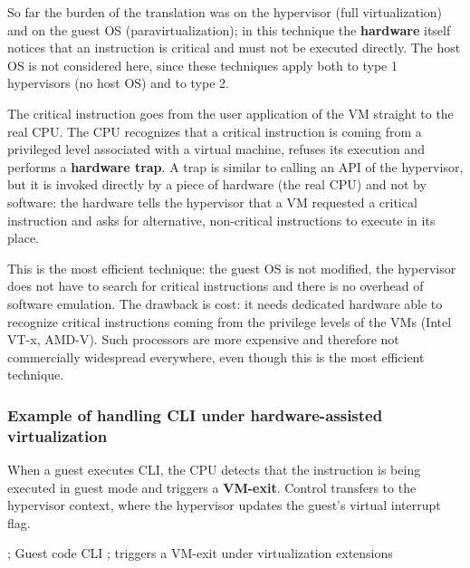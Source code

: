 So far the burden of the translation was on the hypervisor (full virtualization) and on the guest OS (paravirtualization); in this technique the \textbf{hardware} itself notices that an instruction is critical and must not be executed directly. The host OS is not considered here, since these techniques apply both to type 1 hypervisors (no host OS) and to type 2.

The critical instruction goes from the user application of the VM straight to the real CPU. The CPU recognizes that a critical instruction is coming from a privileged level associated with a virtual machine, refuses its execution and performs a \textbf{hardware trap}. A trap is similar to calling an API of the hypervisor, but it is invoked directly by a piece of hardware (the real CPU) and not by software: the hardware tells the hypervisor that a VM requested a critical instruction and asks for alternative, non-critical instructions to execute in its place.

This is the most efficient technique: the guest OS is not modified, the hypervisor does not have to search for critical instructions and there is no overhead of software emulation. The drawback is cost: it needs dedicated hardware able to recognize critical instructions coming from the privilege levels of the VMs (Intel VT-x, AMD-V). Such processors are more expensive and therefore not commercially widespread everywhere, even though this is the most efficient technique.

\begin{center}
\end{center}

\subsubsection*{Example of handling CLI under hardware-assisted virtualization}

When a guest executes CLI, the CPU detects that the instruction is being executed in guest mode and triggers a \textbf{VM-exit}. Control transfers to the hypervisor context, where the hypervisor updates the guest's virtual interrupt flag.

\begin{codeblock}
; Guest code
CLI          ; triggers a VM-exit under virtualization extensions
\end{codeblock}

